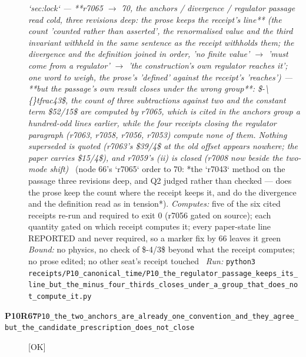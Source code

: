 \begin{description}
\textit{`sec:lock` --- **r7065 \ensuremath{\to} 70, the anchors / divergence / regulator passage read cold, three revisions deep: the prose keeps the receipt's line** (the count 'counted rather than asserted', the renormalised value and the third invariant withheld in the same sentence as the receipt withholds them; the divergence and the definition joined in order, 'no finite value' \ensuremath{\to} 'must come from a regulator' \ensuremath{\to} 'the construction's own regulator reaches it'; one word to weigh, the prose's 'defined' against the receipt's 'reaches') --- **but the passage's own result closes under the wrong group**: \$-\textbackslash\{\}tfrac43\$, the count of three subtractions against two and the constant term \$52/15\$ are computed by r7065, which is cited in the anchors group a hundred-odd lines earlier, while the four receipts closing the regulator paragraph (r7063, r7058, r7056, r7053) compute none of them. Nothing superseded is quoted (r7063's \$39/4\$ at the old offset appears nowhere; the paper carries \$15/4\$), and r7059's (ii) is closed (r7008 now beside the two-mode shift)} \ (node 66's `r7065` order to 70: *the `r7043` method on the passage three revisions deep, and Q2 judged rather than checked --- does the prose keep the count where the receipt keeps it, and do the divergence and the definition read as in tension*). 
\emph{Computes:} five of the six cited receipts re-run and required to exit 0 (r7056 gated on source); each quantity gated on which receipt computes it; every paper-state line REPORTED and never required, so a marker fix by 66 leaves it green
 \emph{Bound:}  no physics, no check of \$-4/3\$ beyond what the receipt computes; no prose edited; no other seat's receipt touched
\ \emph{Run:} \texttt{python3 receipts/P10\_canonical\_time/P10\_the\_regulator\_passage\_keeps\_its\_line\_but\_the\_minus\_four\_thirds\_closes\_under\_a\_group\_that\_does\_not\_compute\_it.py}
\item[\rcptlabel{P10_the_two_anchors_are_already_one_convention_and_they_agree_but_the_candidate_prescription_does_not_close}{P10R67}\textbf{P10R67}\quad\texttt{P10\_the\_two\_anchors\_are\_already\_one\_convention\_and\_they\_agree\_but\_the\_candidate\_prescription\_does\_not\_close}]\hfill\textsf{[OK]}\\

\end{description}
